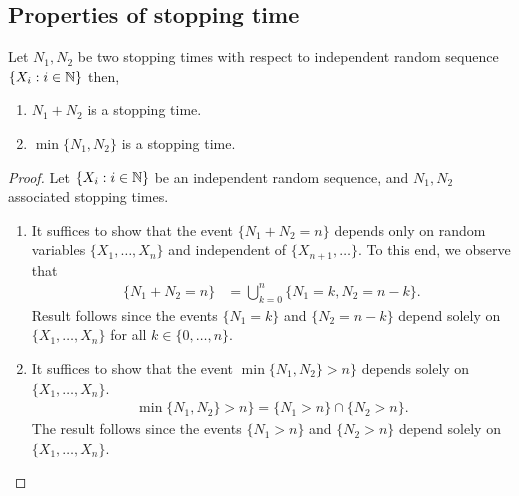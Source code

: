 \documentclass[a4paper,10pt, english]{article}
\begin{document}
\subsection{Properties of stopping time}
Let $N_1,N_2$ be two stopping times with respect to independent random sequence $\{X_i : i \in \mathbb{N} \}$ then,
\begin{enumerate}[i\_]
\item $N_1+N_2$ is a stopping time.
\item $\min \{N_1,N_2\} $ is a stopping time.
\end{enumerate}
\begin{proof}
Let $\{X_i : i \in \mathbb{N} \} $ be an independent random sequence, and $N_1,N_2$ associated stopping times.  
\begin{enumerate}[i\_]
\item It suffices to show that the event $\{N_1+N_2=n\}$ depends only on random variables $\{X_1, \dots, X_n\}$ and independent of $\{X_{n+1}, \dots\}$. 
To this end, we observe that 
\begin{align*}
\{N_1+N_2 = n \} &= \bigcup_{k=0}^{n} \{N_1 = k,N_2 = n-k\}.
\end{align*}
Result follows since the events $\{N_1 = k\}$ and $\{N_2=n-k\}$ depend solely on $\{X_1, \dots, X_n\}$ for all $k \in \{0, \dots, n\}$. 
\item It suffices to show that the event $\min \{N_1,N_2\} > n\}$ depends solely on $\{X_1, \dots, X_n\}$. 
\begin{align*}
\min \{N_1,N_2\} > n\} = \{N_1 > n\} \cap \{N_2 > n\}.
\end{align*}
The result follows since the events $\{N_1 > n\}$ and $\{N_2 > n\}$ depend solely on $\{X_1, \dots, X_n\}$. 
\end{enumerate}
\end{proof}
\end{document}
